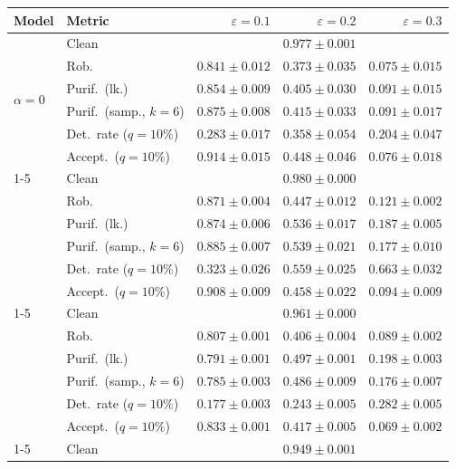 \begin{tabular}{@{}llrrr@{}}
\toprule
Model & Metric & $\varepsilon=0.1$ & $\varepsilon=0.2$ & $\varepsilon=0.3$ \\
\midrule
\multirow{6}{*}{$\alpha{=}0$} & Clean & \multicolumn{3}{c}{$0.977 \pm 0.001$} \\
 & Rob. & $0.841 \pm 0.012$ & $0.373 \pm 0.035$ & $0.075 \pm 0.015$ \\
 & Purif.\ (lk.) & $0.854 \pm 0.009$ & $0.405 \pm 0.030$ & $0.091 \pm 0.015$ \\
 & Purif.\ (samp., $k{=}6$) & $0.875 \pm 0.008$ & $0.415 \pm 0.033$ & $0.091 \pm 0.017$ \\
 & Det.\ rate ($q{=}10\%$) & $0.283 \pm 0.017$ & $0.358 \pm 0.054$ & $0.204 \pm 0.047$ \\
 & Accept.\ ($q{=}10\%$) & $\mathbf{0.914 \pm 0.015}$ & $0.448 \pm 0.046$ & $0.076 \pm 0.018$ \\
\cmidrule(lr){1-5}
\multirow{6}{*}{$\alpha{=}0.01$} & Clean & \multicolumn{3}{c}{$\mathbf{0.980 \pm 0.000}$} \\
 & Rob. & $\mathbf{0.871 \pm 0.004}$ & $0.447 \pm 0.012$ & $0.121 \pm 0.002$ \\
 & Purif.\ (lk.) & $\mathbf{0.874 \pm 0.006}$ & $0.536 \pm 0.017$ & $0.187 \pm 0.005$ \\
 & Purif.\ (samp., $k{=}6$) & $\mathbf{0.885 \pm 0.007}$ & $0.539 \pm 0.021$ & $0.177 \pm 0.010$ \\
 & Det.\ rate ($q{=}10\%$) & $\mathbf{0.323 \pm 0.026}$ & $0.559 \pm 0.025$ & $0.663 \pm 0.032$ \\
 & Accept.\ ($q{=}10\%$) & $0.908 \pm 0.009$ & $0.458 \pm 0.022$ & $0.094 \pm 0.009$ \\
\cmidrule(lr){1-5}
\multirow{6}{*}{$\alpha{=}0.1$} & Clean & \multicolumn{3}{c}{$0.961 \pm 0.000$} \\
 & Rob. & $0.807 \pm 0.001$ & $0.406 \pm 0.004$ & $0.089 \pm 0.002$ \\
 & Purif.\ (lk.) & $0.791 \pm 0.001$ & $0.497 \pm 0.001$ & $0.198 \pm 0.003$ \\
 & Purif.\ (samp., $k{=}6$) & $0.785 \pm 0.003$ & $0.486 \pm 0.009$ & $0.176 \pm 0.007$ \\
 & Det.\ rate ($q{=}10\%$) & $0.177 \pm 0.003$ & $0.243 \pm 0.005$ & $0.282 \pm 0.005$ \\
 & Accept.\ ($q{=}10\%$) & $0.833 \pm 0.001$ & $0.417 \pm 0.005$ & $0.069 \pm 0.002$ \\
\cmidrule(lr){1-5}
\multirow{6}{*}{$\alpha{=}0.2$} & Clean & \multicolumn{3}{c}{$0.949 \pm 0.001$} \\

\end{tabular}
